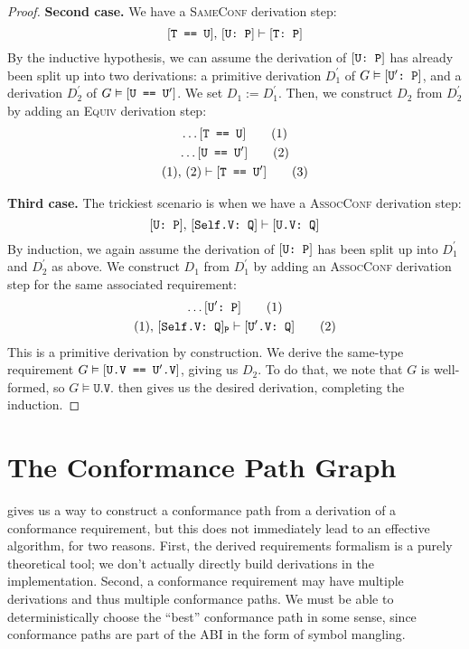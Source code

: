 \documentclass[../generics]{subfiles}
\begin{document}
\begin{proof}
\noindent \textbf{Second case.} We have a \textsc{SameConf} derivation step:
\[[\texttt{T == U}],\,[\texttt{U:~P}]\vdash[\texttt{T:~P}]\]
By the inductive hypothesis, we can assume the derivation of $[\texttt{U:~P}]$ has already been split up into two derivations: a primitive derivation $D_1^\prime$ of $G\vDash[\texttt{$\texttt{U}^\prime$:~P}]$, and a derivation $D_2^\prime$ of $G\vDash[\texttt{U == $\texttt{U}^\prime$}]$. We set $D_1:=D_1^\prime$. Then, we construct $D_2$ from $D_2^\prime$ by adding an \textsc{Equiv} derivation step:
\begin{gather*}
\ldots[\texttt{T == U}]\tag{1}\\
\ldots[\texttt{U == $\texttt{U}^\prime$}]\tag{2}\\
(1),\,(2)\vdash[\texttt{T == $\texttt{U}^\prime$}]\tag{3}
\end{gather*}

\noindent \textbf{Third case.} The trickiest scenario is when we have a \textsc{AssocConf} derivation step:
\[[\texttt{U:~P}],\,[\texttt{Self.V:~Q}]\vdash[\texttt{U.V:~Q}]\]
By induction, we again assume the derivation of $[\texttt{U:~P}]$ has been split up into $D_1^\prime$ and $D_2^\prime$ as above. We construct $D_1$ from $D_1^\prime$ by adding an \textsc{AssocConf} derivation step for the same associated requirement:
\begin{gather*}
\ldots[\texttt{$\texttt{U}^\prime$:~P}]\tag{1}\\
(1),\,[\texttt{Self.V:~Q}]_{\texttt{P}}\vdash[\texttt{$\texttt{U}^\prime$.V:~Q}]\tag{2}
\end{gather*}
This is a primitive derivation by construction. We derive the same-type requirement $G\vDash[\texttt{U.V == $\texttt{U}^\prime$.V}]$, giving us $D_2$. To do that, we note that $G$ is well-formed, so $G\vDash\texttt{U.V}$.  then gives us the desired derivation, completing the induction.
\end{proof}

\section{The Conformance Path Graph}\label{finding conformance paths}

 gives us a way to construct a conformance path from a derivation of a conformance requirement, but this does not immediately lead to an effective algorithm, for two reasons. First, the derived requirements formalism is a purely theoretical tool; we don't actually directly build derivations in the implementation. Second, a conformance requirement may have multiple derivations and thus multiple conformance paths. We must be able to deterministically choose the ``best'' conformance path in some sense, since conformance paths are part of the ABI in the form of symbol mangling.
\end{document}
